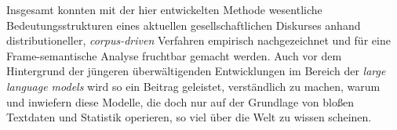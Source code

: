 Insgesamt konnten mit der hier entwickelten Methode wesentliche Bedeutungsstrukturen eines aktuellen gesellschaftlichen Diskurses anhand distributioneller, \emph{corpus-driven} Verfahren empirisch nachgezeichnet und für eine Frame-semantische Analyse fruchtbar gemacht werden. Auch vor dem Hintergrund der jüngeren überwältigenden Entwicklungen im Bereich der \emph{large language models} wird so ein Beitrag geleistet, verständlich zu machen, warum und inwiefern diese Modelle, die doch nur auf der Grundlage von bloßen Textdaten und Statistik operieren, so viel über die Welt zu wissen scheinen.